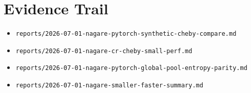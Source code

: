 \documentclass[11pt]{article}
\begin{document}
\section{Evidence Trail}

\begin{itemize}
  \item \texttt{reports/2026-07-01-nagare-pytorch-synthetic-cheby-compare.md}
  \item \texttt{reports/2026-07-01-nagare-cr-cheby-small-perf.md}
  \item \texttt{reports/2026-07-01-nagare-pytorch-global-pool-entropy-parity.md}
  \item \texttt{reports/2026-07-01-nagare-smaller-faster-summary.md}
\end{itemize}
\end{document}
